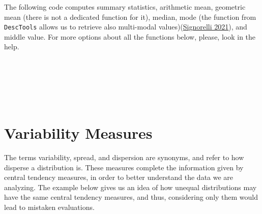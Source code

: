 \documentclass[
]{svmono}
\newenvironment{Shaded}{\begin{snugshade}}{\end{snugshade}}
\newcommand{\CommentTok}[1]{\textcolor[rgb]{0.56,0.35,0.01}{\textit{#1}}}
\newcommand{\DecValTok}[1]{\textcolor[rgb]{0.00,0.00,0.81}{#1}}
\newcommand{\FunctionTok}[1]{\textcolor[rgb]{0.13,0.29,0.53}{\textbf{#1}}}
\newcommand{\NormalTok}[1]{#1}
\newcommand{\SpecialCharTok}[1]{\textcolor[rgb]{0.81,0.36,0.00}{\textbf{#1}}}
\begin{document}
The following code computes summary statistics, arithmetic mean,
geometric mean (there is not a dedicated function for it), median, mode
(the function from \texttt{DescTools} allows us to retrieve also multi-modal
values)(\protect\hyperlink{ref-signorelli2021}{Signorelli 2021}), and middle value. For more options about all
the functions below, please, look in the help.

\begin{Shaded}
\end{Shaded}

~

~

~

\hypertarget{variability-measures}{%
\section{Variability Measures}\label{variability-measures}}

The terms variability, spread, and dispersion are synonyms, and refer to
how disperse a distribution is. These measures complete the information
given by central tendency measures, in order to better understand the
data we are analyzing. The example below gives us an idea of how unequal
distributions may have the same central tendency measures, and thus,
considering only them would lead to mistaken evaluations.
\end{document}
